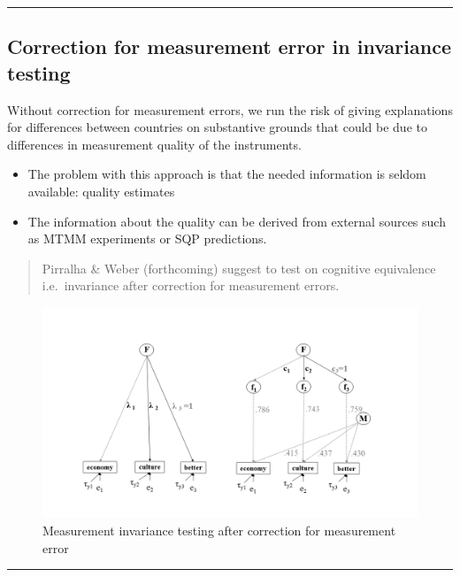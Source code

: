 \documentclass[
]{book}
\begin{document}
\begin{center}\rule{0.5\linewidth}{0.5pt}\end{center}

\hypertarget{correction-for-measurement-error-in-invariance-testing}{%
\subsection{Correction for measurement error in invariance testing}\label{correction-for-measurement-error-in-invariance-testing}}

Without correction for measurement errors, we run the risk of giving explanations for differences between countries on substantive grounds that could be due to differences in measurement quality of the instruments.

\begin{itemize}
\item
  The problem with this approach is that the needed information is seldom available: quality estimates
\item
  The information about the quality can be derived from external sources such as MTMM experiments or SQP predictions.
\end{itemize}

\begin{quote}
Pirralha \& Weber (forthcoming) suggest to test on cognitive equivalence i.e.~invariance after correction for measurement errors.
\end{quote}

\begin{figure}
\centering
\includegraphics{corrected.tiff}
\caption{Measurement invariance testing after correction for measurement error}
\end{figure}

\begin{center}\rule{0.5\linewidth}{0.5pt}\end{center}
\end{document}
